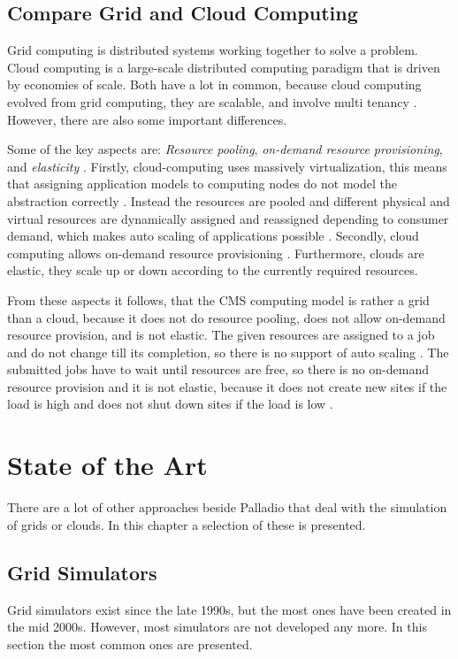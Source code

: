 \section{Compare Grid and Cloud Computing}
\label{grid_cloud}
Grid computing is distributed systems working together to solve a problem. 
Cloud computing is a large-scale distributed computing paradigm that is driven by economies of scale.
Both have a lot in common, because cloud computing evolved from grid computing, they are scalable, and involve multi tenancy \cite{foster2008cloud}.
However, there are also some important differences.

Some of the key aspects are: \textit{Resource pooling}, \textit{on-demand resource provisioning}, and \textit{elasticity} \cite{foster2008cloud}.
Firstly, cloud-computing uses massively virtualization, this means that assigning application models to computing nodes do not model the abstraction correctly \cite{cloud_sim}. Instead the resources are pooled and different physical and virtual resources are dynamically assigned and reassigned depending to consumer demand, which makes auto scaling of applications possible \cite{foster2008cloud}.
Secondly, cloud computing allows on-demand resource provisioning \cite{foster2008cloud}. Furthermore, clouds are elastic, they scale up or down according to the currently required resources.

From these aspects it follows, that the CMS computing model is rather a grid than a cloud, because it does not do resource pooling, does not allow on-demand resource provision, and is not elastic.
The given resources are assigned to a job and do not change till its completion, so there is no support of auto scaling \cite{wlcg_update}. The submitted jobs have to wait until resources are free, so there is no on-demand resource provision and it is not elastic, because it does not create new sites if the load is high and does not shut down sites if the load is low \cite{wlcg_update}.


\chapter{State of the Art}
\label{state}
There are a lot of other approaches beside Palladio that deal with the simulation of grids or clouds.
In this chapter a selection of these is presented.


\section{Grid Simulators}
Grid simulators exist since the late 1990s, but the most ones have been created in the mid 2000s. However, most simulators are not developed any more. In this section the most common ones are presented.

